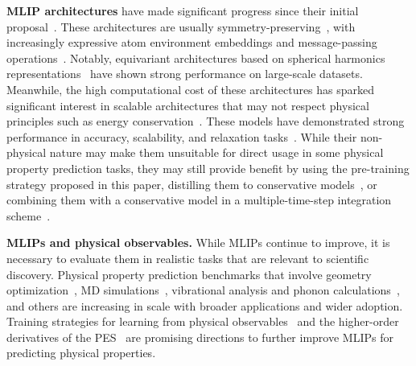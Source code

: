 \documentclass[twocolumn]{fairmeta}
\begin{document}
\textbf{MLIP architectures} have made significant progress since their initial proposal~\citep{behler2007generalized}. These architectures are usually symmetry-preserving~\citep{smith2017ani, schutt2017schnet, gilmer2017neural, chmiela2017machine, artrith2017efficient, unke2018reactive, zhang2018end, zubatyuk2019accurate, smith2020ani, kovacs2021linear}, with increasingly expressive atom environment embeddings and message-passing operations~\citep{klicpera2020Directional, gasteiger2021gemnet, schutt2021equivariant, liu2021spherical, unke2021spookynet, chen2022universal, deng2023chgnet, cheng2024cartesian}. Notably, equivariant architectures based on spherical harmonics representations~\citep{thomas2018tensor, tholke2021equivariant, batzner20223, musaelian2022learning, batatia2022mace, passaro2023reducing, liao2023equiformerv2, bochkarev2024graph, park2024scalable, batatia2025design} have shown strong performance on large-scale datasets. Meanwhile, the high computational cost of these architectures has sparked significant interest in scalable architectures that may not respect physical principles such as energy conservation~\citep{langer2024probing, brehmer2024does, hu2021forcenet, yang2024mattersim, qu2024the, neumann2024orb}. These models have demonstrated strong performance in accuracy, scalability, and relaxation tasks~\citep{oc20, riebesell2023matbench}. While their non-physical nature may make them unsuitable for direct usage in some physical property prediction tasks, they may still provide benefit by using the pre-training strategy proposed in this paper, distilling them to conservative models~\citep{amin2025towards}, or combining them with a conservative model in a multiple-time-step integration scheme~\citep{bigi2024dark}. 

\textbf{MLIPs and physical observables.} While MLIPs continue to improve, it is necessary to evaluate them in realistic tasks that are relevant to scientific discovery. Physical property prediction benchmarks that involve geometry optimization~\citep{riebesell2023matbench, lan2023adsorbml, wander2024cattsunami}, MD simulations~\citep{fu2023forces, kovacs2023mace, moore2024computing, sabanes2024enhancing, eastman2024nutmeg}, vibrational analysis and phonon calculations~\citep{pota2024thermal, loew2024universal, wines2024chips}, and others are increasing in scale with broader applications and wider adoption. Training strategies for learning from physical observables~\citep{wang2020differentiable,  greener2024differentiable, rocken2024predicting, raja2024stability} and the higher-order derivatives of the PES~\citep{fang2024phonon, williams2025hessian} are promising directions to further improve MLIPs for predicting physical properties. 
\end{document}
